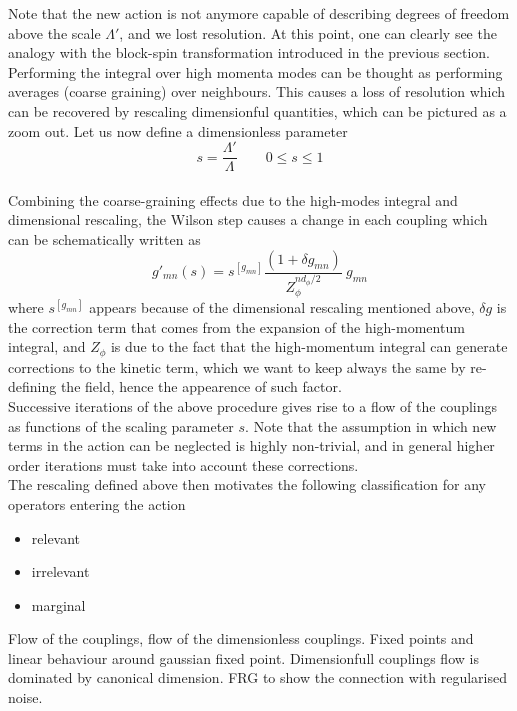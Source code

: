 Note that the new action is not anymore capable of describing degrees of freedom above the scale $\Lambda'$, and we lost resolution. At this point, one can clearly see the analogy with the block-spin transformation introduced in the previous section. Performing the integral over high momenta modes can be thought as performing averages (coarse graining) over neighbours. This causes a loss of resolution which can be recovered by rescaling dimensionful quantities, which can be pictured as a zoom out. Let us now define a dimensionless parameter 
\begin{equation*}
    s = \frac{\Lambda'}{\Lambda} \qquad 0 \leq s \leq 1
\end{equation*}\\
Combining the coarse-graining effects due to the high-modes integral and dimensional rescaling, the Wilson step causes a change in each coupling which can be schematically written as
\begin{equation*}
    g'_{mn}(s) = s^{[g_{mn}]} \frac{(1 + \delta g_{mn})}{Z_\phi^{nd_\phi/2}} \ g_{mn}
\end{equation*}
where $s^{[g_{mn}]}$ appears because of the dimensional rescaling mentioned above, $\delta g$ is the correction term that comes from the expansion of the high-momentum integral, and $Z_\phi$ is due to the fact that the high-momentum integral can generate corrections to the kinetic term, which we want to keep always the same by re-defining the field, hence the appearence of such factor. \\
Successive iterations of the above procedure gives rise to a flow of the couplings as functions of the scaling parameter $s$. Note that the assumption in which new terms in the action can be neglected is highly non-trivial, and in general higher order iterations must take into account these corrections. \\ 
The rescaling defined above then motivates the following classification for any operators entering the action
\begin{itemize}
    \item relevant 
    \item irrelevant
    \item marginal
\end{itemize}
Flow of the couplings, flow of the dimensionless couplings. Fixed points and linear behaviour around gaussian fixed point. Dimensionfull couplings flow is dominated by canonical dimension. FRG to show the connection with regularised noise.



